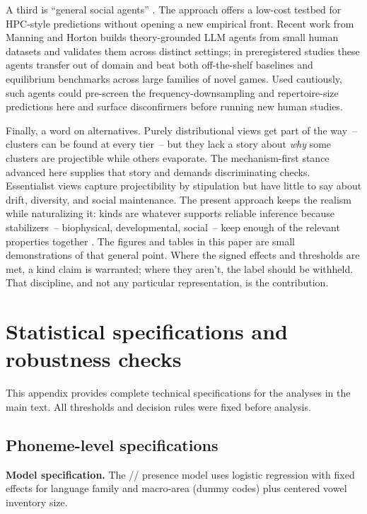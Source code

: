 \documentclass[12pt]{article}
\begin{document}
A third is \enquote{general social agents} \citep{ManningHorton2025GSA}. The approach offers a low-cost testbed for HPC-style predictions without opening a new empirical front. Recent work from Manning and Horton builds theory-grounded LLM agents from small human datasets and validates them across distinct settings; in preregistered studies these agents transfer out of domain and beat both off-the-shelf baselines and equilibrium benchmarks across large families of novel games. Used cautiously, such agents could pre-screen the frequency-downsampling and repertoire-size predictions here and surface disconfirmers before running new human studies.

Finally, a word on alternatives. Purely distributional views get part of the way~-- clusters can be found at every tier~-- but they lack a story about \textit{why} some clusters are projectible while others evaporate. The mechanism-first stance advanced here supplies that story and demands discriminating checks. Essentialist views capture projectibility by stipulation but have little to say about drift, diversity, and social maintenance. The present approach keeps the realism while naturalizing it: kinds are whatever supports reliable inference because stabilizers~-- biophysical, developmental, social~-- keep enough of the relevant properties together \citep{Miller2021WordsSpeciesKinds,Boyd1991Enthusiasm,Boyd1999Homeostasis}. The figures and tables in this paper are small demonstrations of that general point. Where the signed effects and thresholds are met, a kind claim is warranted; where they aren't, the label should be withheld. That discipline, and not any particular representation, is the contribution.


\clearpage
\appendix
\section{Statistical specifications and robustness checks}\label{app:stats}

This appendix provides complete technical specifications for the analyses in the main text. All thresholds and decision rules were fixed before analysis.

\subsection{Phoneme-level specifications}

\textbf{Model specification.} The // presence model uses logistic regression with fixed effects for language family and macro-area (dummy codes) plus centered vowel inventory size. 
\end{document}
